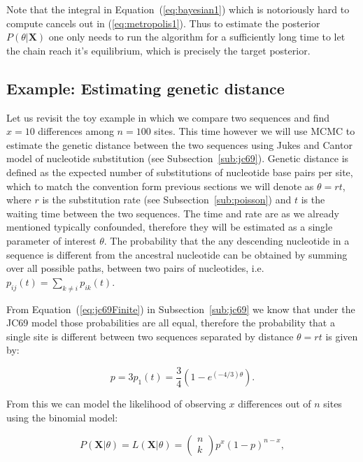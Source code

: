 Note that the integral in Equation~(\ref{eq:bayesian1}) which is notoriously hard to compute cancels out in (\ref{eq:metropolis1}).
Thus to estimate the posterior $P\left(\theta|\mathbf{X}\right)$ one only needs to run the algorithm for a sufficiently long time to let the chain reach it's equilibrium, which is precisely the target posterior.

\subsection{Example: Estimating genetic distance}

Let us revisit the toy example in which we compare two sequences and find $x=10$ differences among $n=100$ sites.
This time however we will use MCMC to estimate the genetic distance between the two sequences using Jukes and Cantor model of nucleotide substitution (see Subsection~\ref{sub:jc69}).
Genetic distance is defined as the expected number of substitutions of nucleotide base pairs per site, which to match the convention form previous sections we will denote as $\theta=rt$, where $r$ is the substitution rate (see Subsection~\ref{sub:poisson}) and $t$ is the waiting time between the two sequences.
The time and rate are as we already mentioned typically confounded, therefore they will be estimated as a single parameter of interest $\theta$.
The probability that the any descending nucleotide in a sequence is different from the ancestral nucleotide can be obtained by summing over all possible paths, between two pairs of nucleotides, i.e. $p_{ij}(t)=\underset{k\neq i}{\sum}p_{ik}(t)$.

From Equation~(\ref{eq:jc69Finite}) in Subsection~\ref{sub:jc69} we know that under the JC69 model those probabilities are all equal, therefore the probability that a single site is different between two sequences separated by distance $\theta=rt$ is given by:

\begin{equation}
p=3p_{1}\left(t\right)=\frac{3}{4}\left(1-e^{\left(-4/3\right)\theta}\right).
\label{eq:distance1}
\end{equation}

\noindent
From this we can model the likelihood of observing $x$ differences out of $n$ sites using the binomial model:

\begin{equation}
P\left(\mathbf{X}|\theta\right)=L\left(\mathbf{X}|\theta\right)=\left(\begin{array}{c}
n\\
k
\end{array}\right)p^{x}(1-p)^{n-x},
\label{eq:likelihood1}
\end{equation}

